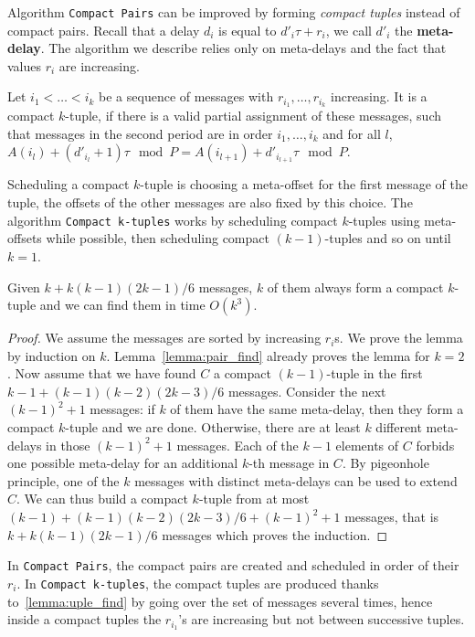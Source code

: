 \documentclass[a4paper,UKenglish,cleveref, autoref, thm-restate]{lipics-v2019}
\newcommand\compactpair{\texttt{Compact Pairs}\xspace}
\begin{document}
Algorithm \compactpair can be improved by forming \emph{compact tuples} instead of compact pairs. Recall that a delay $d_i$ is equal to  $d'_i\tau + r_i$, we call $d'_i$ the \textbf{meta-delay}. The algorithm we describe relies only on meta-delays and the fact that values $r_i$ are increasing.

\begin{definition}
Let $i_1 < \dots < i_k$ be a sequence of messages with $r_{i_1},\dots,r_{i_k}$ increasing. 
It is a compact $k$-tuple, if there is a valid partial assignment of these messages, such that messages in the second period are in order $i_1,\dots,i_k$ and for all $l$, $A(i_l) + (d'_{i_l} + 1)\tau \mod P = A(i_{l+1}) + d'_{i_{l+1}}\tau \mod P$.
\end{definition}

 Scheduling a compact $k$-tuple is choosing a meta-offset for the first message of the tuple, the offsets of the other messages are also fixed by this choice. The algorithm \texttt{Compact k-tuples} works by scheduling compact $k$-tuples using meta-offsets while possible, then scheduling compact $(k-1)$-tuples and so on until $k=1$.
 


\begin{lemma}\label{lemma:uple_find}
Given $k + k(k-1)(2k-1)/6$ messages, $k$ of them always form a compact $k$-tuple and we can find them in time $O(k^3)$. 
\end{lemma}
\begin{proof}
We assume the messages are sorted by increasing $r_i$s. We prove the lemma by induction on $k$. Lemma~\ref{lemma:pair_find} already proves the lemma for $k=2$.
Now assume that we have found $C$ a compact $(k-1)$-tuple in the first $k-1 + (k-1)(k-2)(2k-3)/6$ messages. Consider the next $(k-1)^2 + 1$ messages: if $k$ of them have the same meta-delay, then they form a compact $k$-tuple and we are done. Otherwise, there are at least $k$ different meta-delays in those $(k-1)^2 + 1$ messages. Each of the $k-1$ elements of $C$ forbids one possible meta-delay for an additional $k$-th message in $C$. By pigeonhole principle, one of the $k$ messages with distinct meta-delays can be used to extend $C$. We can thus build a compact $k$-tuple from at most $(k-1) + (k-1)(k-2)(2k-3)/6 + (k-1)^2 + 1$ messages, that is $k + k(k-1)(2k-1)/6$ messages which proves the induction.
\end{proof}

In \compactpair, the compact pairs are created and scheduled in order of their $r_i$. In \texttt{Compact k-tuples}, the compact tuples are produced thanks to~\ref{lemma:uple_find} by going over the set of messages several times, hence inside a compact tuples the $r_{i_1}$'s are increasing but not
between successive tuples. 
\end{document}
